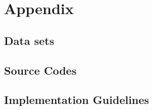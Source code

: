 \documentclass{article}
\begin{document}
\pagebreak

\tableofcontents

\pagebreak











\pagebreak

\section{Appendix}

	\subsection{Data sets}
	\lipsum[1]

	\subsection{Source Codes}
	\lipsum[1]

	\subsection{Implementation Guidelines}
	\lipsum[1]
\end{document}
